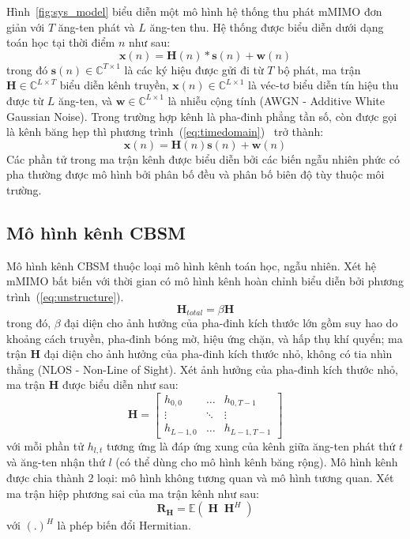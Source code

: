 Hình~\ref{fig:sys_model} biểu diễn một mô hình hệ thống thu phát mMIMO đơn giản với $T$ ăng-ten phát và $L$ ăng-ten thu. Hệ thống được biểu diễn dưới dạng toán học tại thời điểm $n$ như sau: 
\begin{equation}
\label{eq:timedomain}
    \mathbf{x}(n) = \mathbf{H}(n)*\mathbf{s}(n) + \mathbf{w}(n)
\end{equation}
trong đó $\mathbf{s}(n) \in \mathbb{C}^{T \times 1}$ là các ký hiệu được gửi đi từ $T$ bộ phát, ma trận $\mathbf{H} \in \mathbb{C}^{L\times T}$ biểu diễn kênh truyền, $\mathbf{x}(n) \in \mathbb{C}^{L \times 1}$ là véc-tơ biểu diễn tín hiệu thu được từ $L$ ăng-ten, và $\mathbf{w} \in \mathbb{C}^{L \times 1}$ là nhiễu cộng tính (AWGN - Additive White Gaussian Noise).
Trong trường hợp kênh là pha-đinh phẳng tần số, còn được gọi là kênh băng hẹp thì phương trình~(\ref{eq:timedomain})~\cite{Kshetrimayum2017} trở thành:  
\begin{equation}
    \mathbf{x}(n) = \mathbf{H}(n)\mathbf{s}(n) + \mathbf{w}(n)
\end{equation}
Các phần tử trong ma trận kênh được biểu diễn bởi các biến ngẫu nhiên phức có pha thường được mô hình bởi phân bố đều và phân bố biên độ tùy thuộc môi trường.


\subsection{Mô hình kênh CBSM}
Mô hình kênh CBSM thuộc loại mô hình kênh toán học, ngẫu nhiên.
Xét hệ mMIMO bất biến với thời gian có mô hình kênh hoàn chỉnh biểu diễn bởi phương trình~(\ref{eq:unstructure}).
\begin{equation}
    \label{eq:unstructure}
    \mathbf{H}_{total} = \beta \mathbf{H} 
\end{equation}
trong đó, $\beta$ đại diện cho ảnh hưởng của pha-đinh kích thước lớn gồm suy hao do khoảng cách truyền, pha-đinh bóng mờ, hiệu ứng chặn, và hấp thụ khí quyển; ma trận $\mathbf{H}$ đại diện cho ảnh hưởng của pha-đinh kích thước nhỏ, không có tia nhìn thẳng (NLOS - Non-Line of Sight). Xét ảnh hưởng của pha-đinh kích thước nhỏ, ma trận $\mathbf{H}$ được biểu diễn như sau:
\begin{equation}
    \mathbf{H} = \begin{bmatrix}
    h_{0,0} & \ldots  & h_{0, T-1} \\ 
    \vdots & \ddots & \vdots\\ 
    h_{L-1, 0} & \ldots  & h_{L-1, T-1}
    \end{bmatrix}
\end{equation}
với mỗi phần tử $h_{l,t}$ tương ứng là đáp ứng xung của kênh giữa ăng-ten phát thứ $t$ và ăng-ten nhận thứ $l$ (có thể dùng cho mô hình kênh băng rộng). 
Mô hình kênh được chia thành 2 loại: mô hình không tương quan và mô hình tương quan. Xét ma trận hiệp phương sai của ma trận kênh như sau:
\begin{equation}
    \label{eq:1.6}
    \mathbf{R}_{\mathbf{H}} = \mathbb{E} ({\operatorname{\mathbf{H}} \operatorname{\mathbf{H}}^H})
\end{equation}
với $(.)^H$ là phép biến đổi Hermitian.

